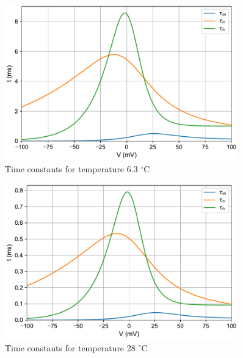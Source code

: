 \documentclass{scrartcl}
\begin{document}
\newpage
\begin{figure}[h]
	\centering
	\includegraphics[width=0.9\textwidth]{figures/tau_temp6.3.pdf}
	\caption{Time constants for temperature 6.3 $^{\circ}$C}
	\label{fig:tau_temp6.3}
\end{figure}
\begin{figure}[h!]
	\centering
	\includegraphics[width=0.9\textwidth]{figures/tau_temp28.pdf}
	\caption{Time constants for temperature 28 $^{\circ}$C}
	\label{fig:tau_temp28}
\end{figure}
\end{document}
